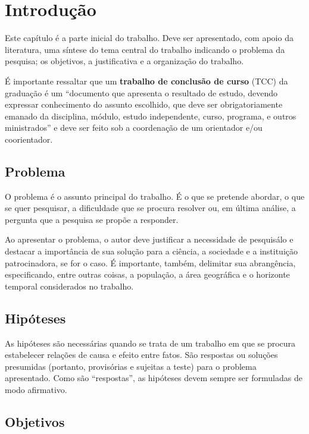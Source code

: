\chapter{Introdução} \label{Introducao}


Este capítulo é a parte inicial do trabalho. Deve ser apresentado, com apoio da literatura, uma síntese do tema central do trabalho indicando o problema da pesquisa; os objetivos, a justificativa e a organização do trabalho. 


É importante ressaltar que um \textbf{trabalho de conclusão de curso} (TCC) da graduação é um ``documento que apresenta o resultado de estudo, devendo expressar conhecimento do assunto escolhido, que deve ser obrigatoriamente emanado da disciplina, módulo, estudo independente, curso, programa, e outros ministrados'' \cite{NBR14724:2011}  e  deve ser feito sob a coordenação de um orientador e/ou coorientador.

\section{Problema}

O problema é o assunto principal do trabalho. É o que se pretende abordar, o
que se quer pesquisar, a dificuldade que se procura resolver ou, em última análise, a
pergunta que a pesquisa se propõe a responder.

Ao apresentar o problema, o autor deve justificar a necessidade de pesquisálo e destacar a importância de sua solução para a ciência, a sociedade e a
instituição patrocinadora, se for o caso. É importante, também, delimitar sua
abrangência, especificando, entre outras coisas, a população, a área geográfica e o
horizonte temporal considerados no trabalho.

\section{Hipóteses}

As hipóteses são necessárias quando se trata de um trabalho em que se
procura estabelecer relações de causa e efeito entre fatos. São respostas ou
soluções presumidas (portanto, provisórias e sujeitas a teste) para o problema
apresentado. Como são “respostas”, as hipóteses devem sempre ser formuladas de
modo afirmativo.

\section{Objetivos}

